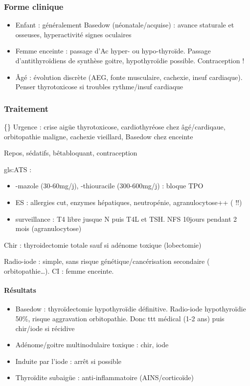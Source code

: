 \documentclass[11pt]{article}
\begin{document}
\subsubsection{Forme clinique}
\label{sec:org0217aaf}
\begin{itemize}
\item Enfant : généralement Basedow (néonatale/acquise) : avance staturale et
osseuses, hyperactivité \textpm{} signes oculaires
\item Femme enceinte : passage d'Ac \thus hyper- ou hypo-thyroïde. Passage
d'antithyroïdiens de synthèse \thus goitre, hypothyroïdie possible. Contraception !
\item Âgé : évolution discrète (AEG, fonte musculaire, cachexie, insuf
cardiaque). Penser thyrotoxicose si troubles rythme/insuf cardiaque
\end{itemize}

\subsubsection{Traitement}
\label{sec:org08ba339}
\{\} Urgence : crise aigüe thyrotoxicose, cardiothyréose chez âgé/cardiqaue,
orbitopathie maligne, cachexie vieillard, Basedow chez \female{} enceinte

Repos, sédatifs, bêtabloquant, contraception

gls:ATS :
\begin{itemize}
\item -mazole (30-60mg/j), -thiouracile (300-600mg/j) : bloque TPO
\item ES : allergies cut, \inc enzymes hépatiques, neutropénie, agranulocytose++
( !!)
\item surveillance : T4 libre jusque N puis T4L et TSH. NFS 10jours pendant 2 mois (agranulocytose)
\end{itemize}

Chir : thyroidectomie totale sauf si adénome toxique (lobectomie)

Radio-iode : simple, sans risque génétique/cancérisation secondaire (\danger{} orbitopathie\ldots{}). CI : femme enceinte.

\paragraph{Résultats}
\label{sec:orge5fd7ac}
\begin{itemize}
\item Basedow : thyroïdectomie \thus hypothyroïdie définitive. Radio-iode \thus
hypothyroïdie 50\%, risque aggravation orbitopathie. Donc ttt médical (1-2
ans) puis chir/iode si récidive
\item Adénome/goitre multinodulaire toxique : chir, iode
\item Induite par l'iode : arrêt si possible
\item Thyroïdite subaigüe : anti-inflammatoire (AINS/corticoïde)
\end{itemize}
\end{document}
